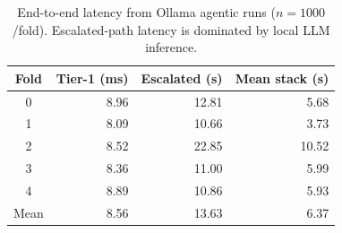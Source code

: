 \begin{table}[!t]
\centering
\caption{End-to-end latency from Ollama agentic runs ($n{=}1000$/fold). Escalated-path latency is dominated by local LLM inference.}
\label{tab:latency}
\begin{tabular}{crrr}
\toprule
Fold & Tier-1 (ms) & Escalated (s) & Mean stack (s) \\
\midrule
0 & 8.96 & 12.81 & 5.68 \\
1 & 8.09 & 10.66 & 3.73 \\
2 & 8.52 & 22.85 & 10.52 \\
3 & 8.36 & 11.00 & 5.99 \\
4 & 8.89 & 10.86 & 5.93 \\
\midrule
Mean & 8.56 & 13.63 & 6.37 \\
\bottomrule
\end{tabular}
\end{table}
